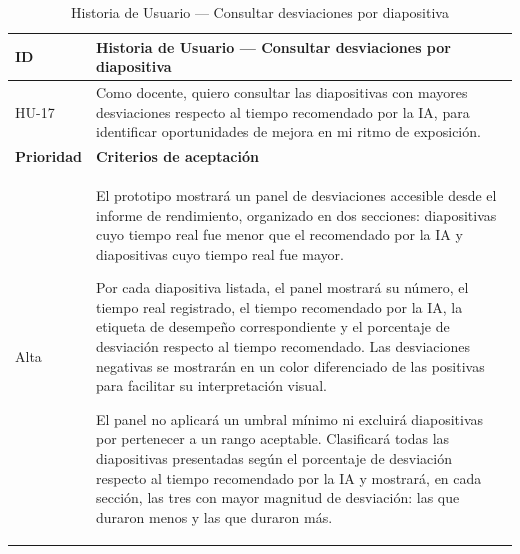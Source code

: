 \documentclass[11pt]{article}
\begin{document}
\begin{table}[H]
    \centering
    \renewcommand{\arraystretch}{1.2}
    \begin{tabular}{|p{2.5cm}|p{11cm}|}
        \hline
        \textbf{ID} & \textbf{Historia de Usuario --- Consultar desviaciones por diapositiva} \\
        \hline
        HU-17 & Como docente, quiero consultar las diapositivas con mayores desviaciones respecto al tiempo recomendado por la IA, para identificar oportunidades de mejora en mi ritmo de exposición. \\
        \hline
        \textbf{Prioridad} & \textbf{Criterios de aceptación} \\
        \hline
        Alta & El prototipo mostrará un panel de desviaciones accesible desde el informe de rendimiento, organizado en dos secciones: diapositivas cuyo tiempo real fue menor que el recomendado por la IA y diapositivas cuyo tiempo real fue mayor.

        Por cada diapositiva listada, el panel mostrará su número, el tiempo real registrado, el tiempo recomendado por la IA, la etiqueta de desempeño correspondiente y el porcentaje de desviación respecto al tiempo recomendado. Las desviaciones negativas se mostrarán en un color diferenciado de las positivas para facilitar su interpretación visual.

        El panel no aplicará un umbral mínimo ni excluirá diapositivas por pertenecer a un rango aceptable. Clasificará todas las diapositivas presentadas según el porcentaje de desviación respecto al tiempo recomendado por la IA y mostrará, en cada sección, las tres con mayor magnitud de desviación: las que duraron menos y las que duraron más. \\
        \hline
    \end{tabular}
    \caption{Historia de Usuario --- Consultar desviaciones por diapositiva}
    \label{tab:hu-consultar-desviaciones-diapositiva}
\end{table}
\end{document}
